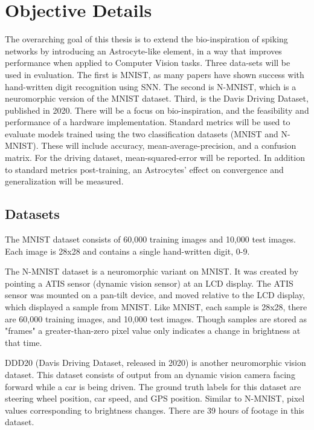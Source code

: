 %
%


\chapter{Objective Details}\label{section:objective_details}
    The overarching goal of this thesis is to extend the bio-inspiration of spiking networks by introducing an Astrocyte-like element, in a way that improves performance when applied to Computer Vision tasks. Three data-sets will be used in evaluation. The first is MNIST, as many papers have shown success with hand-written digit recognition using SNN. The second is N-MNIST, which is a neuromorphic version of the MNIST dataset. Third, is the Davis Driving Dataset, published in 2020. There will be a focus on bio-inspiration, and the feasibility and performance of a hardware implementation. Standard metrics will be used to evaluate models trained using the two classification datasets (MNIST and N-MNIST). These will include accuracy, mean-average-precision, and a confusion matrix. For the driving dataset, mean-squared-error will be reported. In addition to standard metrics post-training, an Astrocytes' effect on convergence and generalization will be measured.
    
    \section{Datasets} \label{section:datasets}
    The MNIST dataset consists of 60,000 training images and 10,000 test images. Each image is 28x28 and contains a single hand-written digit, 0-9.
    
    The N-MNIST dataset is a neuromorphic variant on MNIST. It was created by pointing a ATIS sensor (dynamic vision sensor) at an LCD display. The ATIS sensor was mounted on a pan-tilt device, and moved relative to the LCD display, which displayed a sample from MNIST. Like MNIST, each sample is 28x28, there are 60,000 training images, and 10,000 test images. Though samples are stored as "frames" a greater-than-zero pixel value only indicates a change in brightness at that time.
    
    DDD20 (Davis Driving Dataset, released in 2020) is another neuromorphic vision dataset. This dataset consists of output from an dynamic vision camera facing forward while a car is being driven. The ground truth labels for this dataset are steering wheel position, car speed, and GPS position. Similar to N-MNIST, pixel values corresponding to brightness changes. There are 39 hours of footage in this dataset.
    
